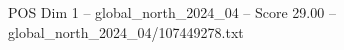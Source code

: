 \begin{textsample}{POS Dim 1 – global\_north\_2024\_04 – Score 29.00 – global\_north\_2024\_04/107449278.txt}
\end{textsample}
